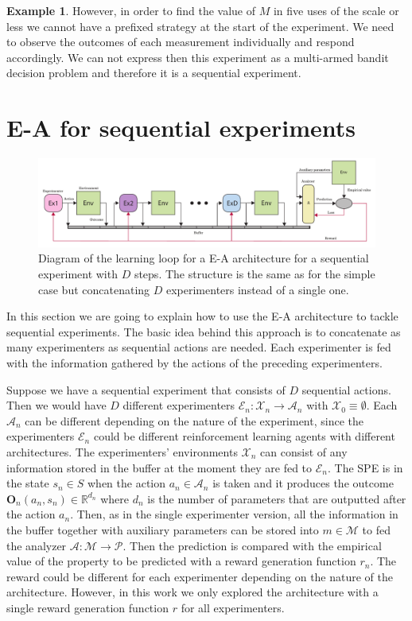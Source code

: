\documentclass[11pt,a4paper,twoside]{report}
\newcommand{\+}{\textnormal{+} }
\theoremstyle{definition}
\newtheorem{myex}[mythm]{Example}
\numberwithin{equation}{chapter}
\begin{document}
\begin{myex}
However, in order to find the value of $M$ in five uses of the scale or less we
cannot have a prefixed strategy at the start of the experiment. We need to
observe the outcomes of each measurement individually and respond accordingly.
We can not express then this experiment as a multi-armed bandit decision problem
and therefore it is a sequential experiment.

\end{myex}

\section{E-A for sequential experiments}

\begin{figure}[t]
  \includegraphics[width=\columnwidth]{figures/sequential-EA.pdf}
  \caption{Diagram of the learning loop for a E-A architecture for a 
  sequential experiment with $D$ steps. The structure is the same as for 
  the simple case but concatenating $D$ experimenters instead of a single one.}
  \label{fig:SequentialEA}
\end{figure}

In this section we are going to explain how to use the E-A architecture to
tackle sequential experiments. The basic idea behind this approach is to
concatenate as many experimenters as sequential actions are needed. Each
experimenter is fed with the information gathered by the actions of the
preceding experimenters. 

Suppose we have a sequential experiment that consists of $D$ sequential actions.
Then we would have $D$ different experimenters $\mathscr{E}_n:\mathcal{X}_n\rightarrow
\mathcal{A}_n$ with $\mathcal{X}_0\equiv\emptyset$. Each $\mathcal{A}_n$ can be
different depending on the nature of the experiment, since the experimenters
$\mathscr{E}_n$ could be different reinforcement learning agents with different
architectures. The experimenters' environments $\mathcal{X}_n$ can consist of
any information stored in the buffer at the moment they are fed to $\mathscr{E}_n$. The
SPE is in the state $s_n \in S$ when the action $a_n \in \mathcal{A}_n$ is taken
and it produces the outcome $\textbf{O}_n(a_n, s_n) \in \mathbb{R}^{d_n}$ where
$d_n$ is the number of parameters that are outputted after the action $a_n$.
Then, as in the single experimenter version, all the information in the buffer
together with auxiliary parameters can be stored into $m\in\mathcal{M}$ to fed
the analyzer $\mathscr{A}:\mathcal{M}\rightarrow \mathcal{P}$. Then the prediction is
compared with the empirical value of the property to be predicted with a reward
generation function $r_n$. The reward could be different for each experimenter
depending on the nature of the architecture. However, in this work we only
explored the architecture with a single reward generation function $r$ for all
experimenters.
\end{document}
